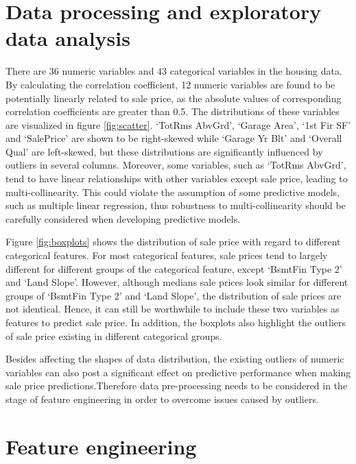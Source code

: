 \documentclass[letterpaper,12pt,twoside,]{pinp}
\begin{document}
\hypertarget{data-processing-and-exploratory-data-analysis}{%
\section{Data processing and exploratory data
analysis}\label{data-processing-and-exploratory-data-analysis}}

There are 36 numeric variables and 43 categorical variables in the
housing data. By calculating the correlation coefficient, 12 numeric
variables are found to be potentially linearly related to sale price, as
the absolute values of corresponding correlation coefficients are
greater than 0.5. The distributions of these variables are visualized in
figure \ref{fig:scatter}. `TotRms AbvGrd', `Garage Area', `1st Fir SF'
and `SalePrice' are shown to be right-skewed while `Garage Yr Blt' and
`Overall Qual' are left-skewed, but these distributions are
significantly influenced by outliers in several columns. Moreover, some
variables, such as `TotRms AbvGrd', tend to have linear relationships
with other variables except sale price, leading to multi-collinearity.
This could violate the assumption of some predictive models, such as
multiple linear regression, thus robustness to multi-collinearity should
be carefully considered when developing predictive models.

Figure \ref{fig:boxplots} shows the distribution of sale price with
regard to different categorical features. For most categorical features,
sale prices tend to largely different for different groups of the
categorical feature, except `BsmtFin Type 2' and `Land Slope'. However,
although medians sale prices look similar for different groups of
`BsmtFin Type 2' and `Land Slope', the distribution of sale prices are
not identical. Hence, it can still be worthwhile to include these two
variables as features to predict sale price. In addition, the boxplots
also highlight the outliers of sale price existing in different
categorical groups.

Besides affecting the shapes of data distribution, the existing outliers
of numeric variables can also post a significant effect on predictive
performance when making sale price predictions.Therefore data
pre-processing needs to be considered in the stage of feature
engineering in order to overcome issues caused by outliers.

\hypertarget{feature-engineering}{%
\section{Feature engineering}\label{feature-engineering}}
\end{document}
